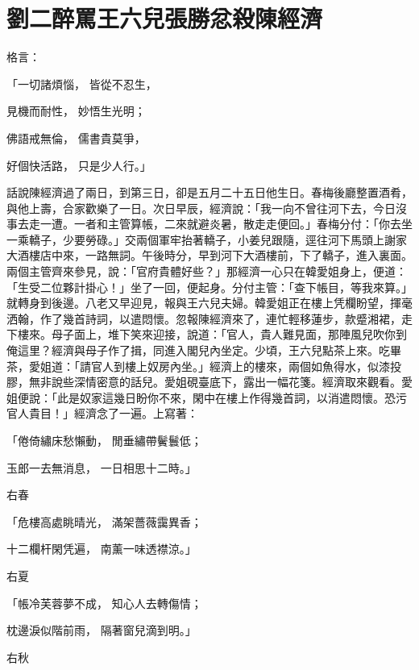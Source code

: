 %

\chapter{劉二醉罵王六兒\KG 張勝忿殺陳經濟}


\begin{showcontents}{}



格言：

「一切諸煩惱，  皆從不忍生，

見機而耐性，  妙悟生光明；

佛語戒無倫，  儒書貴莫爭，

好個快活路，  只是少人行。」

話說陳經濟過了兩日，到第三日，卻是五月二十五日他生日。春梅後廳整置酒肴，與他上壽，合家歡樂了一日。次日早辰，經濟說：「我一向不曾往河下去，今日沒事去走一遭。一者和主管算帳，二來就避炎暑，散走走便回。」春梅分付：「你去坐一乘轎子，少要勞碌。」交兩個軍牢抬著轎子，小姜兒跟隨，逕往河下馬頭上謝家大酒樓店中來，一路無詞。午後時分，早到河下大酒樓前，下了轎子，進入裏面。兩個主管齊來參見，說：「官府貴體好些？」那經濟一心只在韓愛姐身上，便道：「生受二位夥計掛心！」坐了一回，便起身。分付主管：「查下帳目，等我來算。」就轉身到後邊。八老又早迎見，報與王六兒夫婦。韓愛姐正在樓上凭欄盼望，揮毫洒翰，作了幾首詩詞，以遣悶懷。忽報陳經濟來了，連忙輕移蓮步，款蹙湘裙，走下樓來。母子面上，堆下笑來迎接，說道：「官人，貴人難見面，那陣風兒吹你到俺這里？經濟與母子作了揖，同進入閣兒內坐定。少頃，王六兒點茶上來。吃畢茶，愛姐道：「請官人到樓上奴房內坐。」經濟上的樓來，兩個如魚得水，似漆投膠，無非說些深情密意的話兒。愛姐硯臺底下，露出一幅花箋。經濟取來觀看。愛姐便說：「此是奴家這幾日盼你不來，閑中在樓上作得幾首詞，以消遣悶懷。恐污官人貴目！」經濟念了一遍。上寫著：

「倦倚繡床愁懶動，  閒垂繡帶鬢鬟低；

玉郎一去無消息，  一日相思十二時。」

右春

「危樓高處眺晴光，  滿架薔薇靄異香；

十二欄杆閑凭遍，  南薰一味透襟涼。」

右夏

「帳冷芙蓉夢不成，  知心人去轉傷情；

枕邊淚似階前雨，  隔著窗兒滴到明。」

右秋


\end{showcontents}
